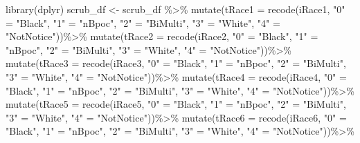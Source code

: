 \documentclass[
  english,
]{book}
\newenvironment{Shaded}{\begin{snugshade}}{\end{snugshade}}
\newcommand{\AttributeTok}[1]{\textcolor[rgb]{0.77,0.63,0.00}{#1}}
\newcommand{\FunctionTok}[1]{\textcolor[rgb]{0.00,0.00,0.00}{#1}}
\newcommand{\NormalTok}[1]{#1}
\newcommand{\OtherTok}[1]{\textcolor[rgb]{0.56,0.35,0.01}{#1}}
\newcommand{\SpecialCharTok}[1]{\textcolor[rgb]{0.00,0.00,0.00}{#1}}
\newcommand{\StringTok}[1]{\textcolor[rgb]{0.31,0.60,0.02}{#1}}
\begin{document}
\begin{Shaded}
\begin{Highlighting}[]
\FunctionTok{library}\NormalTok{(dplyr)}
\NormalTok{scrub\_df }\OtherTok{\textless{}{-}}\NormalTok{ scrub\_df }\SpecialCharTok{\%\textgreater{}\%}
  \FunctionTok{mutate}\NormalTok{(}\AttributeTok{tRace1 =} \FunctionTok{recode}\NormalTok{(iRace1, }\StringTok{"0"} \OtherTok{=} \StringTok{"Black"}\NormalTok{, }\StringTok{"1"} \OtherTok{=} \StringTok{"nBpoc"}\NormalTok{, }\StringTok{"2"} \OtherTok{=} \StringTok{"BiMulti"}\NormalTok{, }\StringTok{"3"} \OtherTok{=} \StringTok{"White"}\NormalTok{, }\StringTok{"4"} \OtherTok{=} \StringTok{"NotNotice"}\NormalTok{))}\SpecialCharTok{\%\textgreater{}\%}
  \FunctionTok{mutate}\NormalTok{(}\AttributeTok{tRace2 =} \FunctionTok{recode}\NormalTok{(iRace2, }\StringTok{"0"} \OtherTok{=} \StringTok{"Black"}\NormalTok{, }\StringTok{"1"} \OtherTok{=} \StringTok{"nBpoc"}\NormalTok{, }\StringTok{"2"} \OtherTok{=} \StringTok{"BiMulti"}\NormalTok{, }\StringTok{"3"} \OtherTok{=} \StringTok{"White"}\NormalTok{, }\StringTok{"4"} \OtherTok{=} \StringTok{"NotNotice"}\NormalTok{))}\SpecialCharTok{\%\textgreater{}\%}
  \FunctionTok{mutate}\NormalTok{(}\AttributeTok{tRace3 =} \FunctionTok{recode}\NormalTok{(iRace3, }\StringTok{"0"} \OtherTok{=} \StringTok{"Black"}\NormalTok{, }\StringTok{"1"} \OtherTok{=} \StringTok{"nBpoc"}\NormalTok{, }\StringTok{"2"} \OtherTok{=} \StringTok{"BiMulti"}\NormalTok{, }\StringTok{"3"} \OtherTok{=} \StringTok{"White"}\NormalTok{, }\StringTok{"4"} \OtherTok{=} \StringTok{"NotNotice"}\NormalTok{))}\SpecialCharTok{\%\textgreater{}\%}
  \FunctionTok{mutate}\NormalTok{(}\AttributeTok{tRace4 =} \FunctionTok{recode}\NormalTok{(iRace4, }\StringTok{"0"} \OtherTok{=} \StringTok{"Black"}\NormalTok{, }\StringTok{"1"} \OtherTok{=} \StringTok{"nBpoc"}\NormalTok{, }\StringTok{"2"} \OtherTok{=} \StringTok{"BiMulti"}\NormalTok{, }\StringTok{"3"} \OtherTok{=} \StringTok{"White"}\NormalTok{, }\StringTok{"4"} \OtherTok{=} \StringTok{"NotNotice"}\NormalTok{))}\SpecialCharTok{\%\textgreater{}\%}
  \FunctionTok{mutate}\NormalTok{(}\AttributeTok{tRace5 =} \FunctionTok{recode}\NormalTok{(iRace5, }\StringTok{"0"} \OtherTok{=} \StringTok{"Black"}\NormalTok{, }\StringTok{"1"} \OtherTok{=} \StringTok{"nBpoc"}\NormalTok{, }\StringTok{"2"} \OtherTok{=} \StringTok{"BiMulti"}\NormalTok{, }\StringTok{"3"} \OtherTok{=} \StringTok{"White"}\NormalTok{, }\StringTok{"4"} \OtherTok{=} \StringTok{"NotNotice"}\NormalTok{))}\SpecialCharTok{\%\textgreater{}\%}
  \FunctionTok{mutate}\NormalTok{(}\AttributeTok{tRace6 =} \FunctionTok{recode}\NormalTok{(iRace6, }\StringTok{"0"} \OtherTok{=} \StringTok{"Black"}\NormalTok{, }\StringTok{"1"} \OtherTok{=} \StringTok{"nBpoc"}\NormalTok{, }\StringTok{"2"} \OtherTok{=} \StringTok{"BiMulti"}\NormalTok{, }\StringTok{"3"} \OtherTok{=} \StringTok{"White"}\NormalTok{, }\StringTok{"4"} \OtherTok{=} \StringTok{"NotNotice"}\NormalTok{))}\SpecialCharTok{\%\textgreater{}\%}

\end{Highlighting}
\end{Shaded}
\end{document}

